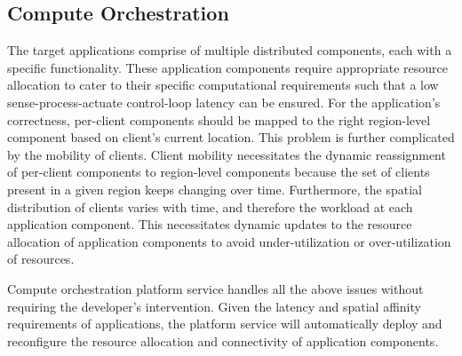 \subsection{Compute Orchestration}
The target applications comprise of multiple distributed components, each with a specific functionality. These application components require appropriate resource allocation to cater to their specific computational requirements such that a low sense-process-actuate control-loop latency can be ensured. For the application's correctness, per-client components should be mapped to the right region-level component based on client's current location. This problem is further complicated by the mobility of clients. Client mobility necessitates the dynamic reassignment of per-client components to region-level components because the set of clients present in a given region keeps changing over time. Furthermore, the spatial distribution of clients varies with time, and therefore the workload at each application component. This necessitates dynamic updates to the resource allocation of application components to avoid under-utilization or over-utilization of resources. 
\par Compute orchestration platform service handles all the above issues without requiring the developer's intervention. Given the latency and spatial affinity requirements of applications, the platform service will automatically deploy and reconfigure the resource allocation and connectivity of application components. 

